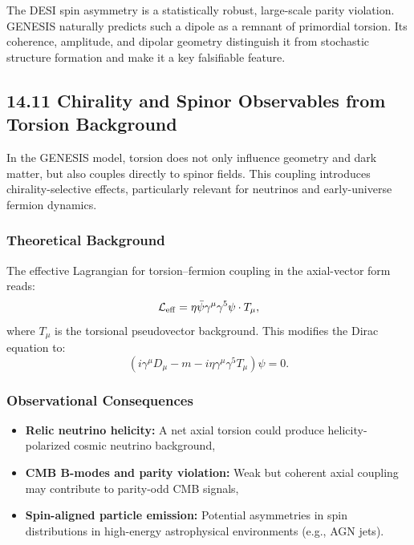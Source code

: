 \documentclass{article}
\begin{document}
\begin{tcolorbox}[colback=gray!5, colframe=black!30, title=Why this matters]
The DESI spin asymmetry is a statistically robust, large-scale parity violation. GENESIS naturally predicts such a dipole as a remnant of primordial torsion. Its coherence, amplitude, and dipolar geometry distinguish it from stochastic structure formation and make it a key falsifiable feature.
\end{tcolorbox}


\subsection*{14.11 Chirality and Spinor Observables from Torsion Background}
\label{sec:spinor_observables}

In the GENESIS model, torsion does not only influence geometry and dark matter, but also couples directly to spinor fields. This coupling introduces chirality-selective effects, particularly relevant for neutrinos and early-universe fermion dynamics.

\subsubsection*{Theoretical Background}
The effective Lagrangian for torsion–fermion coupling in the axial-vector form reads:
\begin{equation}
\mathcal{L}_{\rm eff} = \eta \bar{\psi} \gamma^\mu \gamma^5 \psi \cdot T_\mu,
\end{equation}
where $T_\mu$ is the torsional pseudovector background. This modifies the Dirac equation to:
\begin{equation}
\left(i \gamma^\mu D_\mu - m - i \eta \gamma^\mu \gamma^5 T_\mu \right) \psi = 0.
\end{equation}

\subsubsection*{Observational Consequences}
\begin{itemize}
  \item \textbf{Relic neutrino helicity:} A net axial torsion could produce helicity-polarized cosmic neutrino background,
  \item \textbf{CMB B-modes and parity violation:} Weak but coherent axial coupling may contribute to parity-odd CMB signals,
  \item \textbf{Spin-aligned particle emission:} Potential asymmetries in spin distributions in high-energy astrophysical environments (e.g., AGN jets).
\end{itemize}
\end{document}
